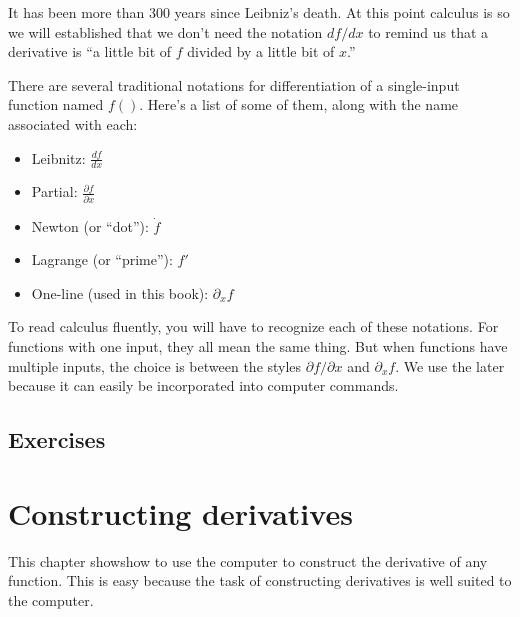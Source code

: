 \documentclass[
  letterpaper,
  DIV=11,
  numbers=noendperiod,
  oneside]{scrreprt}
\begin{document}
It has been more than 300 years since Leibniz's death. At this point
calculus is so we will established that we don't need the notation
\(df/dx\) to remind us that a derivative is ``a little bit of \(f\)
divided by a little bit of \(x\).''

There are several traditional notations for differentiation of a
single-input function named \(f()\). Here's a list of some of them,
along with the name associated with each:

\begin{itemize}
\item
  Leibnitz: \(\frac{df}{dx}\)
\item
  Partial: \(\frac{\partial f}{\partial x}\)
\item
  Newton (or ``dot''): \(\dot{f}\)
\item
  Lagrange (or ``prime''): \(f'\)
\item
  One-line (used in this book): \(\partial_x f\)
\end{itemize}

To read calculus fluently, you will have to recognize each of these
notations. For functions with one input, they all mean the same thing.
But when functions have multiple inputs, the choice is between the
styles \(\partial f / \partial x\) and \(\partial_x f\). We use the
later because it can easily be incorporated into computer commands.

\hypertarget{exercises-2}{%
\section{Exercises}\label{exercises-2}}

\hypertarget{sec-computing-derivs}{%
\chapter{Constructing derivatives}\label{sec-computing-derivs}}

This chapter showshow to use the computer to construct the derivative of
any function. This is easy because the task of constructing derivatives
is well suited to the computer. {}
\end{document}
